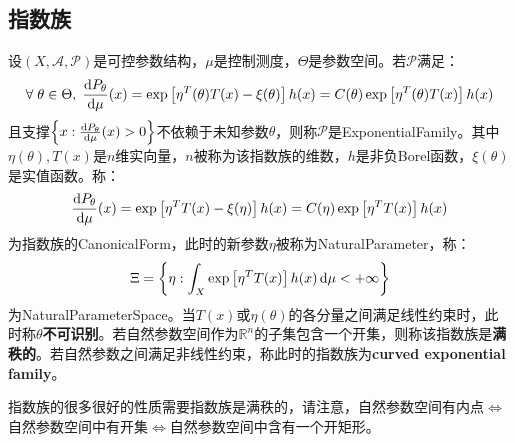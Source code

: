 \subsection{指数族}
\begin{definition}
	设$(X,\mathscr{A},\mathscr{P})$是可控参数结构，$\mu$是控制测度，$\Theta$是参数空间。若$\mathscr{P}$满足：
	\begin{equation*}
		\forall\;\theta\in\Theta,\;\frac{\mathop{}\!\mathrm{d} P_{\theta}}{\mathop{}\!\mathrm{d}\mu}(x)=\exp\left[\eta^T(\theta)T(x)-\xi(\theta)\right]h(x)=C(\theta)\exp\left[\eta^T(\theta)T(x)\right]h(x)
	\end{equation*}
	且支撑$\left\{x:\frac{\mathop{}\!\mathrm{d} P_{\theta}}{\mathop{}\!\mathrm{d}\mu}(x)>0\right\}$不依赖于未知参数$\theta$，则称$\mathscr{P}$是\gls{ExponentialFamily}。其中$\eta(\theta),T(x)$是$n$维实向量，$n$被称为该指数族的维数，$h$是非负Borel函数，$\xi(\theta)$是实值函数。称：
	\begin{equation*}
		\frac{\mathop{}\!\mathrm{d} P_{\theta}}{\mathop{}\!\mathrm{d}\mu}(x)=\exp\left[\eta^TT(x)-\xi(\eta)\right]h(x)=C(\eta)\exp\left[\eta^TT(x)\right]h(x)
	\end{equation*}
	为指数族的\gls{CanonicalForm}，此时的新参数$\eta$被称为\gls{NaturalParameter}，称：
	\begin{equation*}
		\Xi=\left\{\eta:\int_{X}\exp\left[\eta^TT(x)\right]h(x)\mathop{}\!\mathrm{d}\mu<+\infty\right\}
	\end{equation*}
	为\gls{NaturalParameterSpace}。当$T(x)$或$\eta(\theta)$的各分量之间满足线性约束时，此时称$\theta$\textbf{不可识别}。若自然参数空间作为$\mathbb{R}^{n}$的子集包含一个开集，则称该指数族是\textbf{满秩的}。若自然参数之间满足非线性约束，称此时的指数族为\textbf{curved exponential family}。
\end{definition}
\begin{note}
	指数族的很多很好的性质需要指数族是满秩的，请注意，自然参数空间有内点$\iff$自然参数空间中有开集$\iff$自然参数空间中含有一个开矩形。
\end{note}
